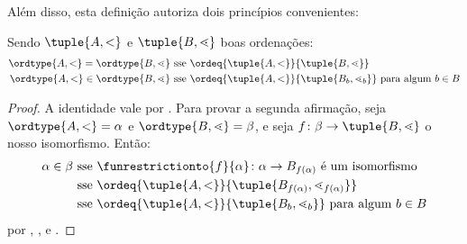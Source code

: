 \documentclass[../../../include/open-logic-section]{subfiles}
\begin{document}
Além disso, esta definição autoriza dois princípios convenientes:

\begin{cor}
Sendo $\tuple{A, <}$ e $\tuple{B, \lessdot}$ boas ordenações: 
\begin{align*}
	\ordtype{A, <} = \ordtype{B, \lessdot}&\text{ sse }\ordeq{\tuple{A, <}}{\tuple{B, \lessdot}}\\
	\ordtype{A, <} \in \ordtype{B, \lessdot}&\text{ sse }\ordeq{\tuple{A, <}}{\tuple{B_b, \lessdot_b}}\text{ para algum }b \in B
\end{align*}
\end{cor}

\begin{proof}
A identidade vale por . Para provar
a segunda afirmação, seja $\ordtype{A, <} = \alpha$ e $\ordtype{B,
\lessdot} = \beta$, e seja $f \colon \beta \to \tuple {B, \lessdot}$
o nosso isomorfismo. Então:
\begin{align*}
	\alpha \in \beta&\text{ sse }\funrestrictionto{f}{\alpha} \colon \alpha \to B_{f(\alpha)}\text{ é um isomorfismo}\\
	&\text{ sse }\ordeq{\tuple{A, <}}{\tuple{B_{f(\alpha)}, \lessdot_{f(\alpha)}}}\\
	&\text{ sse }\ordeq{\tuple{A, <}}{\tuple{B_b, \lessdot_b}}\text{ para algum $b \in B$}
\end{align*}
por ,
, e
.
\end{proof}
\end{document}
